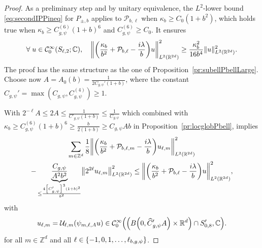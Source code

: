 \documentclass[AHL,Unicode,longabstracts]{cedram}
\newcommand{\C}{\mathbb{C}}
\newcommand{\Z}{\mathbb{Z}}
\newcommand{\R}{\mathbb{R}}
\newcommand{\clC}{\mathcal{C}}
\newcommand{\clP}{\mathcal{P}}
\newcommand{\clU}{\mathcal{U}}
\newcommand\norm[1]{\left\lVert#1\right\rVert}
\let\oldhat\hat
\renewcommand*{\hat}[1]{\mathchoice{\widehat{#1}}{\widehat{#1}}{\oldhat{#1}}{\oldhat{#1}}}
\let\oldforall\forall
\renewcommand*{\forall}{\mathrel{\oldforall}}
\let\originalleft\left
\let\originalright\right
\renewcommand{\left}{\mathopen{}\mathclose\bgroup\originalleft}
\renewcommand{\right}{\aftergroup\egroup\originalright}
\newcounter{setofstep}
\newcounter{step}[setofstep]
\begin{document}
\begin{proof}
As a preliminary step and by unitary equivalence, the $L^{2}$-lower bound \eqref{eq:secondIPPineq} for $P_{\pm,b}$ applies to $\clP_{b,\ell}$ when $\kappa_{b}\geq C_{0}(1+b^{2})$, which holds true when $\kappa_{b}\geq C_{g,\psi}^{(6)}(1+b)^{6}$ and $C_{g,\psi}^{(6)}\geq C_{0}$. It ensures
\begin{equation}\label{eq:prelstep}
\forall u\in \clC^{\infty}_{0}(S_{\ell,2};\C),\quad\left\|\left(\frac{\kappa_{b}}{b^{2}}+\clP_{b,\ell}-\frac{i\lambda}{b}\right)u
\right\|^{2}_{L^{2}(\R^{2d})}\geq \frac{\kappa_{b}^{2}}{16b^{4}}\|u\|^{2}_{L^{2}(\R^{2d})}.
\end{equation}
The proof has the same structure as the one of Proposition~\ref{pr:subellPbellLarge}. Choose now $A=A_0(b)=\frac{1}{2C_{{g,\psi}}'(1+b)}$, where the constant $C_{g,\psi}'=\max(C_{g,\psi},C^{(4)}_{g,\psi})\geq 1$.

With $2^{-\ell}A\leq 2A\leq \frac{1}{C'_{g,\psi}(1+b)}\leq \frac{1}{C_{g,\psi}}$ which combined with $\kappa_{b}\geq C_{g,\psi}^{(6)}(1+b)^{6}\geq \frac{b}{2(1+b)}\geq C_{g,\psi}Ab$ in Proposition~\ref{pr:locglobPbell}, implies
\begin{multline}\label{eq:minonew}
\sum_{m\in \Z^d}\frac{1}{8}\left\| \left(\frac{\kappa_{b}}{b^{2}}+\clP_{b,\ell,m} - \frac{i\lambda}{b}\right) u_{\ell,m}\right\|^{2}_{L^2(\R^{2d})}
\\
-\underbrace{\frac{C_{g,\psi}}{A^{2}b^2}}_{\leq \frac{4\left[C_{g,\psi}'\right]^{3}(1+b)^{2}}{b^{2}}}
\norm{2^{2\ell}u_{\ell,m}}_{L^2(\R^{2d})}^2
\leq
\left\|\left(\frac{\kappa_{b}}{b^{2}}+\clP_{b,\ell} - \frac{i\lambda}{b}\right) u \right\|^{2}_{L^2(\R^{2d})},
\end{multline}
with
\[
u_{\ell,m}=\clU_{\ell,m}(\psi_{m,\ell,A}u) \in \clC^\infty_0\left(\left(B\left(0,\hat{C}'_{g,\psi}A\right)\times \R^d\right)\cap S_{0,8}',\C\right).
\]
for all $m\in \Z^{d}$ and all $\ell\in\left\{-1,0,1,\dots,\ell_{b,g,\psi}\right\}$.


\end{proof}
\end{document}
